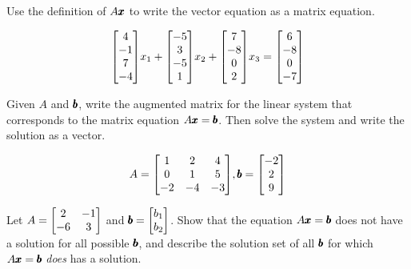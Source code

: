 \documentclass{../mathhomework}
\newenvironment{Mat}{\begin{bmatrix}}{\end{bmatrix}}
\begin{document}
\begin{problem}[1.4\#7]
    Use the definition of $A\pmb{x}$ to write the vector equation as a matrix equation.

    \begin{equation*}
        \begin{Mat}
            4 \\ -1 \\ 7 \\ -4
        \end{Mat}x_1 + \begin{Mat}
            -5 \\ 3 \\ -5 \\ 1
        \end{Mat}x_2 + \begin{Mat}
            7 \\ -8 \\ 0 \\ 2
        \end{Mat}x_3 = \begin{Mat}
            6 \\ -8 \\ 0 \\ -7
        \end{Mat}
    \end{equation*}
\end{problem}

\begin{problem}[1.4\#11]
    Given $A$ and $\pmb{b}$, write the augmented matrix for the linear system that corresponds to the matrix equation $A\pmb{x} = \pmb{b}$. Then solve the system and write the solution as a vector.

    \begin{equation*}
        A = \begin{Mat}
            1 & 2 & 4 \\
            0 & 1 & 5 \\
            -2 & -4 & -3
        \end{Mat}, \Vect{b} = \begin{Mat}
            -2 \\ 2 \\ 9
        \end{Mat}
    \end{equation*}
\end{problem}

\begin{problem}[1.4\#15]
    Let $A = \begin{Mat}
        2 & -1 \\
        -6 & 3
    \end{Mat}$ and $\Vect{b} = \begin{Mat}
        b_1 \\ b_2
    \end{Mat}$. Show that the equation $A\pmb{x} = \pmb{b}$ does not have a solution for all possible $\pmb{b}$, 
    and describe the solution set of all $\pmb{b}$ for which $A\pmb{x} = \pmb{b}$ \textit{does} has a solution.
\end{problem}
\end{document}
